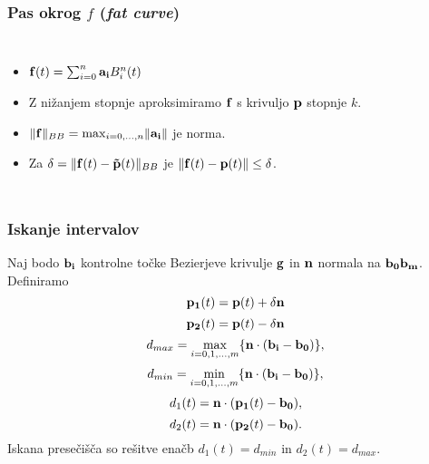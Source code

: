 \documentclass[unknownkeysallowed]{beamer}
\begin{document}
\begin{frame}
\frametitle{Pas okrog $f$ ({\em fat curve})}
\begin{columns}[c]
	\begin{itemize}
		\item ${\bf f}(t) = \sum _{i=0}^n{\bf a_i}B_i^n(t)$
		\medskip
		\item Z nižanjem stopnje aproksimiramo ${\bf f}$ s krivuljo ${\bf p}$ stopnje $k$.
		\medskip
		\item $\lVert {\bf f} \rVert _{BB} = \max _{i = 0,\ldots,n} \lVert {\bf a_i} \rVert $ je norma.
		\medskip
		\item Za $\delta = \lVert {\bf f}(t) - {\bf \tilde{p}}(t) \rVert _{BB}$ je $\lVert {\bf f}(t) - {\bf p}(t) \rVert \leq \delta$.
	\end{itemize}
	
\end{columns}
\end{frame}

\begin{frame}
\frametitle{Iskanje intervalov}
\begin{small}
Naj bodo ${\bf b_i}$ kontrolne točke Bezierjeve krivulje ${\bf g}$ in ${\bf n}$ normala na ${\bf b_0b_m}$. Definiramo
\medskip
$$
{\bf p_1}(t) = {\bf p}(t) + \delta {\bf n} 
$$
$$
{\bf p_2}(t) = {\bf p}(t) - \delta {\bf n}
$$
$$
d_{max} = \max _{i=0,1,\ldots,m}\{ {\bf n}\cdot({\bf b_i}-{\bf b_0})\},
$$
$$
d_{min} = \min _{i=0,1,\ldots,m} \{ {\bf n}\cdot({\bf b_i}-{\bf b_0})\} ,
$$
$$
d_1(t) = {\bf n}\cdot ({\bf p_1}(t) - {\bf b_0}),
$$
$$
d_2(t) = {\bf n}\cdot ({\bf p_2}(t) - {\bf b_0}).
$$
Iskana presečišča so rešitve enačb $d_1(t) = d_{min}$ in $d_2(t) = d_{max}$.
\end{small}
\end{frame}

\end{document}
